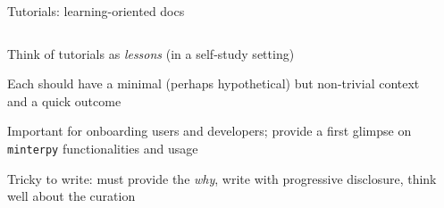 \documentclass[english,aspectratio=169]{beamer}
\let\tempone\itemize
\let\temptwo\enditemize
\renewenvironment{itemize}{\tempone\addtolength{\itemsep}{0.35\baselineskip}}{\temptwo}
\begin{document}
\begin{frame}{Tutorials: learning-oriented docs}
\footnotesize
    
\begin{columns}[onlytextwidth]
    
\begin{column}{0.5\textwidth}

\begin{itemize}
    \item Think of tutorials as \emph{lessons} (in a self-study setting)
    \item Each should have a minimal (perhaps hypothetical) but non-trivial context\\
          and a quick outcome
    \item Important for onboarding users and developers;
          provide a first glimpse on \texttt{minterpy} functionalities and usage
    \item Tricky to write: must provide the \emph{why},
          write with progressive disclosure,
          think well about the curation 
\end{itemize}

\end{column}


\end{columns}
\end{frame}
\end{document}
